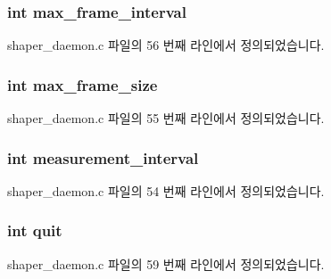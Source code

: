 \subsubsection[{\texorpdfstring{max\+\_\+frame\+\_\+interval}{max_frame_interval}}]{\setlength{\rightskip}{0pt plus 5cm}int max\+\_\+frame\+\_\+interval}\hypertarget{structcmd__ip_a0aab5ed8ce61499c1535ea86d3090930}{}\label{structcmd__ip_a0aab5ed8ce61499c1535ea86d3090930}


shaper\+\_\+daemon.\+c 파일의 56 번째 라인에서 정의되었습니다.

\subsubsection[{\texorpdfstring{max\+\_\+frame\+\_\+size}{max_frame_size}}]{\setlength{\rightskip}{0pt plus 5cm}int max\+\_\+frame\+\_\+size}\hypertarget{structcmd__ip_a09c29b0090a82147afdb50ae0013b9c6}{}\label{structcmd__ip_a09c29b0090a82147afdb50ae0013b9c6}


shaper\+\_\+daemon.\+c 파일의 55 번째 라인에서 정의되었습니다.

\subsubsection[{\texorpdfstring{measurement\+\_\+interval}{measurement_interval}}]{\setlength{\rightskip}{0pt plus 5cm}int measurement\+\_\+interval}\hypertarget{structcmd__ip_a848591ef9ab34f6f2eb816fe385fa4d4}{}\label{structcmd__ip_a848591ef9ab34f6f2eb816fe385fa4d4}


shaper\+\_\+daemon.\+c 파일의 54 번째 라인에서 정의되었습니다.

\subsubsection[{\texorpdfstring{quit}{quit}}]{\setlength{\rightskip}{0pt plus 5cm}int quit}\hypertarget{structcmd__ip_a2896431d6a80cd39b3d24b40237612ee}{}\label{structcmd__ip_a2896431d6a80cd39b3d24b40237612ee}


shaper\+\_\+daemon.\+c 파일의 59 번째 라인에서 정의되었습니다.

